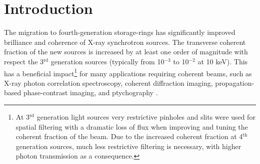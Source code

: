 \documentclass{iucr}              %
\begin{document}
\section{Introduction}
\label{sec:introduction}

The migration to fourth-generation storage-rings has significantly improved brilliance and coherence of X-ray synchrotron sources. The transverse coherent fraction of the new sources is increased by at least one order of magnitude with respect the 3$^{\text{rd}}$ generation sources (typically from 10$^{-3}$ to 10$^{-2}$ at 10 keV). This has a beneficial impact\footnote{At 3$^{\text{rd}}$ generation light sources very restrictive pinholes and slits were used for spatial filtering with a dramatic loss of flux when improving and tuning the coherent fraction of the beam. Due to the increased coherent fraction at 4$^{\text{th}}$ generation sources, much less restrictive filtering is necessary, with higher photon transmission as a consequence.} for many applications requiring coherent beams, such as X-ray photon correlation spectroscopy, coherent diffraction imaging, propagation-based phase-contrast imaging, and ptychography \cite{paganin_book}.
\end{document}
